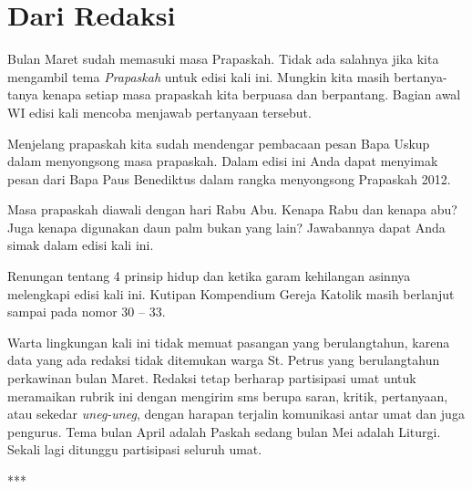 \newpage

\chapter*{Dari Redaksi}
\footnotesize
{}
Bulan Maret sudah memasuki masa Prapaskah. Tidak ada salahnya jika kita mengambil tema \textit{Prapaskah} untuk edisi kali ini. Mungkin kita masih bertanya-tanya kenapa setiap masa prapaskah kita berpuasa dan berpantang. Bagian awal WI edisi kali mencoba menjawab pertanyaan tersebut.

\bigskip
Menjelang prapaskah kita sudah mendengar pembacaan pesan Bapa Uskup dalam menyongsong masa prapaskah. Dalam edisi ini Anda dapat menyimak pesan dari Bapa Paus Benediktus dalam rangka menyongsong Prapaskah 2012.

\bigskip
Masa prapaskah diawali dengan hari Rabu Abu. Kenapa Rabu dan kenapa abu? Juga kenapa digunakan daun palm bukan yang lain? Jawabannya dapat Anda simak dalam edisi kali ini. 
 
\bigskip
Renungan tentang 4 prinsip hidup dan ketika garam kehilangan asinnya melengkapi edisi kali ini. Kutipan Kompendium Gereja Katolik masih berlanjut sampai pada nomor 30 -- 33.

\bigskip

Warta lingkungan kali ini tidak memuat pasangan yang berulangtahun, karena data yang ada redaksi tidak ditemukan warga St. Petrus yang berulangtahun perkawinan bulan Maret. Redaksi tetap berharap partisipasi umat untuk meramaikan rubrik ini dengan mengirim sms berupa saran, kritik, pertanyaan, atau sekedar \textit{uneg-uneg}, dengan harapan terjalin komunikasi antar umat dan juga pengurus. Tema bulan April adalah Paskah sedang bulan Mei adalah Liturgi. Sekali lagi ditunggu partisipasi seluruh umat.
\normalsize

\begin{center}***\end{center} 

\vfill

\normalsize

